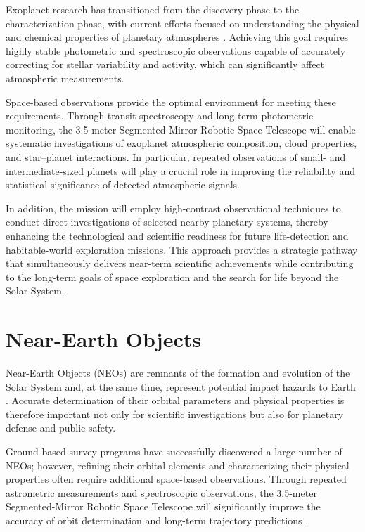 Exoplanet research has transitioned from the discovery phase to the characterization phase, with current efforts focused on understanding the physical and chemical properties of planetary atmospheres \cite{seager2013}. Achieving this goal requires highly stable photometric and spectroscopic observations capable of accurately correcting for stellar variability and activity, which can significantly affect atmospheric measurements.

Space-based observations provide the optimal environment for meeting these requirements. Through transit spectroscopy and long-term photometric monitoring, the 3.5-meter Segmented-Mirror Robotic Space Telescope will enable systematic investigations of exoplanet atmospheric composition, cloud properties, and star--planet interactions. In particular, repeated observations of small- and intermediate-sized planets will play a crucial role in improving the reliability and statistical significance of detected atmospheric signals.

In addition, the mission will employ high-contrast observational techniques to conduct direct investigations of selected nearby planetary systems, thereby enhancing the technological and scientific readiness for future life-detection and habitable-world exploration missions. This approach provides a strategic pathway that simultaneously delivers near-term scientific achievements while contributing to the long-term goals of space exploration and the search for life beyond the Solar System.

\section{Near-Earth Objects}

Near-Earth Objects (NEOs) are remnants of the formation and evolution of the Solar System and, at the same time, represent potential impact hazards to Earth \cite{mainzer2011}. Accurate determination of their orbital parameters and physical properties is therefore important not only for scientific investigations but also for planetary defense and public safety.

Ground-based survey programs have successfully discovered a large number of NEOs; however, refining their orbital elements and characterizing their physical properties often require additional space-based observations. Through repeated astrometric measurements and spectroscopic observations, the 3.5-meter Segmented-Mirror Robotic Space Telescope will significantly improve the accuracy of orbit determination and long-term trajectory predictions \cite{nasa2023}.


